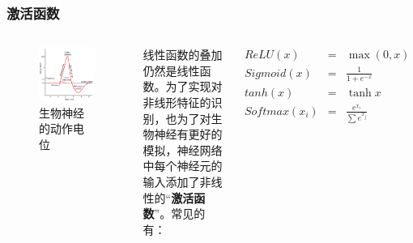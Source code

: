\documentclass{ctexbeamer}
\begin{document}
\begin{frame}
    \frametitle{激活函数}
    \begin{columns}
        \begin{figure}
            \includegraphics[width=\linewidth]{../lib/neuron.png}
            \caption{生物神经的动作电位}            
        \end{figure}

        线性函数的叠加仍然是线性函数。为了实现对非线形特征的识别，也为了对生物神经有更好的模拟，神经网络中每个神经元的输入添加了非线性的“\textbf{激活函数}”。常见的有：

        \begin{eqnarray}
            ReLU(x)&=&\max(0,x)\\
            Sigmoid(x)&=&\frac {1}{1+e^{-x}}\\
            tanh(x)&=&\tanh{x}\\
            Softmax(x_i)&=&\frac{e^{x_i}}{\sum e^{x_j}}
        \end{eqnarray}

    \end{columns}
\end{frame}
\end{document}
